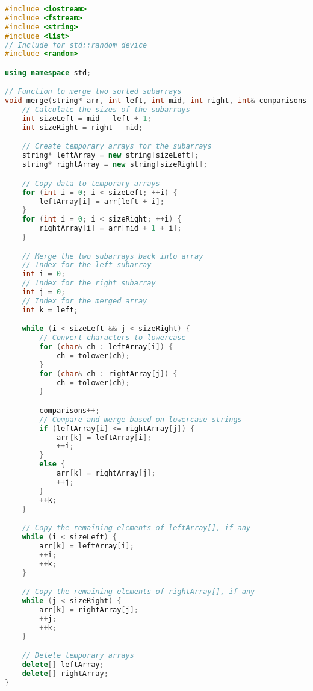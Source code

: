 \documentclass[letterpaper, 10pt,DIV=13]{scrartcl}
\numberwithin{equation}{section} %
\numberwithin{figure}{section} %
\numberwithin{table}{section} %
\begin{document}
\begin{linenumbers}
\begin{lstlisting}[language=C++, caption={Merge Function}, label={code:example}]
#include <iostream>
#include <fstream>
#include <string>
#include <list>
// Include for std::random_device
#include <random>

using namespace std;

// Function to merge two sorted subarrays
void merge(string* arr, int left, int mid, int right, int& comparisons) {
    // Calculate the sizes of the subarrays
    int sizeLeft = mid - left + 1;
    int sizeRight = right - mid;

    // Create temporary arrays for the subarrays
    string* leftArray = new string[sizeLeft];
    string* rightArray = new string[sizeRight];

    // Copy data to temporary arrays
    for (int i = 0; i < sizeLeft; ++i) {
        leftArray[i] = arr[left + i];
    }
    for (int i = 0; i < sizeRight; ++i) {
        rightArray[i] = arr[mid + 1 + i];
    }

    // Merge the two subarrays back into array
    // Index for the left subarray
    int i = 0; 
    // Index for the right subarray
    int j = 0; 
    // Index for the merged array
    int k = left; 

    while (i < sizeLeft && j < sizeRight) {
        // Convert characters to lowercase
        for (char& ch : leftArray[i]) {
            ch = tolower(ch);
        }
        for (char& ch : rightArray[j]) {
            ch = tolower(ch);
        }

        comparisons++;
        // Compare and merge based on lowercase strings
        if (leftArray[i] <= rightArray[j]) {
            arr[k] = leftArray[i];
            ++i;
        }
        else {
            arr[k] = rightArray[j];
            ++j;
        }
        ++k;
    }

    // Copy the remaining elements of leftArray[], if any
    while (i < sizeLeft) {
        arr[k] = leftArray[i];
        ++i;
        ++k;
    }

    // Copy the remaining elements of rightArray[], if any
    while (j < sizeRight) {
        arr[k] = rightArray[j];
        ++j;
        ++k;
    }

    // Delete temporary arrays
    delete[] leftArray;
    delete[] rightArray;
}
\end{lstlisting}
\end{linenumbers}
\nolinenumbers
\end{document}
